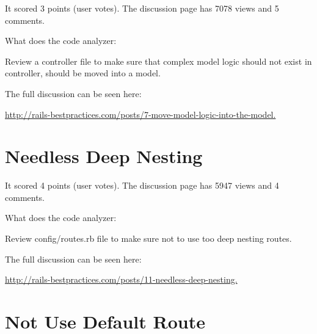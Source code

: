 
It scored 3 points (user votes). 
The discussion page has 7078 views and 5 comments.

What does the code analyzer:

Review a controller file to make sure that complex model logic should not exist in controller,
should be moved into a model.

The full discussion can be seen here:

\url{http://rails-bestpractices.com/posts/7-move-model-logic-into-the-model.}

\section{Needless Deep Nesting}


It scored 4 points (user votes). 
The discussion page has 5947 views and 4 comments.

What does the code analyzer:

Review config/routes.rb file to make sure not to use too deep nesting routes.

The full discussion can be seen here:

\url{http://rails-bestpractices.com/posts/11-needless-deep-nesting.}

\section{Not Use Default Route}


